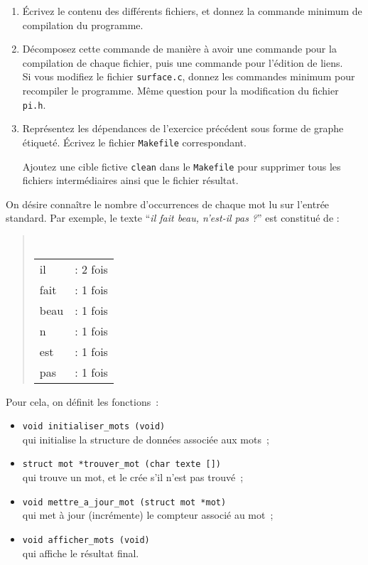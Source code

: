 \begin {enumerate}
    \item
	Écrivez le contenu des différents fichiers, et
	donnez la commande minimum de compilation du programme.

    \item
	Décomposez cette commande de manière à avoir une commande pour
	la compilation de chaque fichier, puis une commande pour
	l'édition de liens.  \\
	Si vous modifiez le fichier {\tt surface.c}, donnez les
	commandes minimum pour recompiler le programme.  Même question
	pour la modification du fichier {\tt pi.h}.

    \item
	Représentez les dépendances de l'exercice précédent sous forme
	de graphe étiqueté.  Écrivez le fichier {\tt Makefile}
	correspondant.

	Ajoutez une cible fictive {\tt clean} dans le {\tt Makefile}
	pour supprimer tous les fichiers intermédiaires ainsi que le
	fichier résultat.

\end {enumerate}


\question

On désire connaître le nombre d'occurrences de chaque mot lu sur
l'entrée standard.  Par exemple, le texte ``{\em il fait beau, n'est-il
pas ?}'' est constitué de :

\begin {quote}
    \renewcommand {\arraystretch} {0.9}
    \tt
    \begin {tabular} {ll}
	il   & : 2 fois \\
	fait & : 1 fois \\
	beau & : 1 fois \\
	n    & : 1 fois \\
	est  & : 1 fois \\
	pas  & : 1 fois 
    \end {tabular}
\end {quote}

Pour cela, on définit les fonctions~:

\begin {itemize}
    \item \verb:void initialiser_mots (void): \\
	qui initialise la structure de données associée aux mots~;

    \item \verb:struct mot *trouver_mot (char texte []): \\
	qui trouve un mot, et le crée s'il n'est pas trouvé~;

    \item \verb:void mettre_a_jour_mot (struct mot *mot): \\
	qui met à jour (incrémente) le compteur associé au mot~;

    \item \verb:void afficher_mots (void): \\
	qui affiche le résultat final.

\end {itemize}



